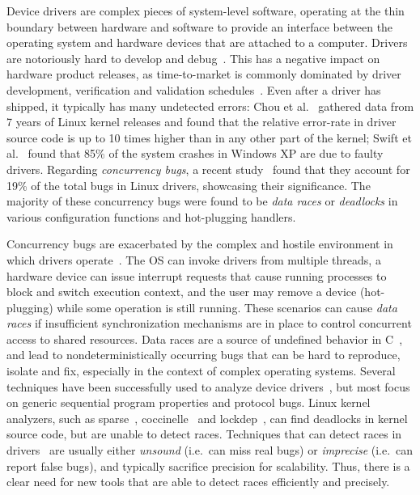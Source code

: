 Device drivers are complex pieces of system-level software, operating at the thin boundary between hardware and software to provide an interface between the operating system and hardware devices that are attached to a computer. Drivers are notoriously hard to develop and debug~\cite{corbet2005linux}. This has a negative impact on hardware product releases, as time-to-market is commonly dominated by driver development, verification and validation schedules~\cite{yavatkar2012era}.
%
Even after a driver has shipped, it typically has many undetected errors: Chou et al.~\cite{chou2001empirical} gathered data from 7 years of Linux kernel releases and found that the relative error-rate in driver source code is up to 10 times higher than in any other part of the kernel; Swift et al.~\cite{Swift2003windowsxp} found that 85\% of the system crashes in Windows XP are due to faulty drivers. Regarding \emph{concurrency bugs}, a recent study~\cite{ryzhyk2009dingo} found that they account for 19\% of the total bugs in Linux drivers, showcasing their significance. The majority of these concurrency bugs were found to be \emph{data races} or \emph{deadlocks} in various configuration functions and hot-plugging handlers.

Concurrency bugs are exacerbated by the complex and hostile environment in which drivers operate~\cite{corbet2005linux}. The OS can invoke drivers from multiple threads, a hardware device can issue interrupt requests that cause running processes to block and switch execution context, and the user may remove a device (hot-plugging) while some operation is still running.  These scenarios can cause \emph{data races} if insufficient synchronization mechanisms are in place to control concurrent access to shared resources.
%
Data races are a source of undefined behavior in C~\cite[p.\ 38]{iso/iec11}, and lead to nondeterministically occurring bugs that can be hard to reproduce, isolate and fix, especially in the context of complex operating systems.
%
Several techniques have been successfully used to analyze device drivers~\cite{ball2006thorough, clarke2004predicate, engler2000checking, henzinger2002temporal, cook2006termination, kuznetsov2010testing, renzelmann2012symdrive, lal2012corral}, but most focus on generic sequential program properties and protocol bugs. Linux kernel analyzers, such as sparse~\cite{corbet2004sparse}, coccinelle~\cite{padioleau2008doc} and lockdep~\cite{corbet2006lock}, can find deadlocks in kernel source code, but are unable to detect races. Techniques that can detect races in drivers~\cite{dawson2003racerx, qadeer2004kiss, pratikakis2006locksmith, voung2007relay, lal2012corral} are usually either \emph{unsound} (i.e.\ can miss real bugs) or \emph{imprecise} (i.e.\ can report false bugs), and typically sacrifice precision for scalability. Thus, there is a clear need for new tools that are able to detect races efficiently and precisely.


